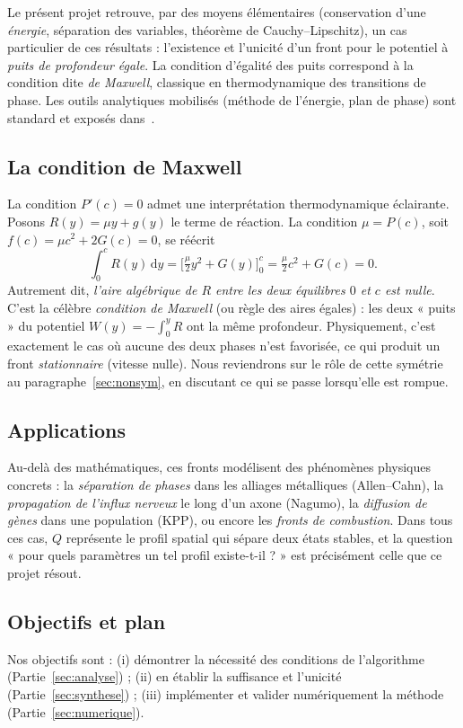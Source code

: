 \documentclass[11pt,a4paper]{article}
\theoremstyle{plain}
\theoremstyle{remark}
\newcommand{\dd}{\,\mathrm{d}}
\begin{document}
Le présent projet retrouve, par des moyens élémentaires (conservation d'une
\emph{énergie}, séparation des variables, théorème de Cauchy–Lipschitz), un cas
particulier de ces résultats : l'existence et l'unicité d'un front pour le
potentiel à \emph{puits de profondeur égale}. La condition d'égalité des puits
correspond à la condition dite \emph{de Maxwell}, classique en thermodynamique
des transitions de phase. Les outils analytiques mobilisés (méthode de l'énergie,
plan de phase) sont standard et exposés dans~\cite{evans2010,strogatz2015}.

\subsection{La condition de Maxwell}
\label{sec:maxwell}
La condition $P'(c)=0$ admet une interprétation thermodynamique éclairante.
Posons $R(y)=\mu y+g(y)$ le terme de réaction. La condition $\mu=P(c)$, soit
$f(c)=\mu c^2+2G(c)=0$, se réécrit
\[
  \int_0^c R(y)\dd y=\Big[\tfrac{\mu}{2}y^2+G(y)\Big]_0^c
  =\tfrac{\mu}{2}c^2+G(c)=0.
\]
Autrement dit, \emph{l'aire algébrique de $R$ entre les deux équilibres $0$ et
$c$ est nulle}. C'est la célèbre \emph{condition de Maxwell} (ou règle des aires
égales) : les deux « puits » du potentiel
$W(y)=-\int_0^y R$ ont la même profondeur. Physiquement, c'est exactement le cas
où aucune des deux phases n'est favorisée, ce qui produit un front
\emph{stationnaire} (vitesse nulle). Nous reviendrons sur le rôle de cette
symétrie au paragraphe~\ref{sec:nonsym}, en discutant ce qui se passe lorsqu'elle
est rompue.

\subsection*{Applications}
Au-delà des mathématiques, ces fronts modélisent des phénomènes physiques
concrets : la \emph{séparation de phases} dans les alliages métalliques
(Allen–Cahn), la \emph{propagation de l'influx nerveux} le long d'un axone
(Nagumo), la \emph{diffusion de gènes} dans une population (KPP), ou encore les
\emph{fronts de combustion}. Dans tous ces cas, $Q$ représente le profil
spatial qui sépare deux états stables, et la question « pour quels paramètres un
tel profil existe-t-il ? » est précisément celle que ce projet résout.

\subsection{Objectifs et plan}
Nos objectifs sont : (i) démontrer la nécessité des conditions de l'algorithme
(Partie~\ref{sec:analyse}) ; (ii) en établir la suffisance et l'unicité
(Partie~\ref{sec:synthese}) ; (iii) implémenter et valider numériquement la
méthode (Partie~\ref{sec:numerique}).
\end{document}

